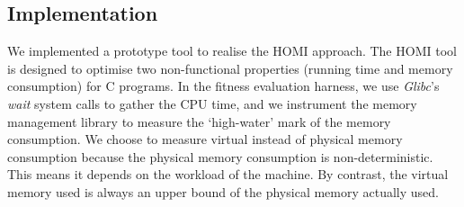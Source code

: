 \documentclass[oribibl]{llncs}
\begin{document}
\subsection{Implementation}
\vspace{-4mm}
We implemented a prototype tool to realise the HOMI approach. The HOMI tool is designed to optimise two non-functional properties (running time and memory consumption) for C programs.
In the fitness evaluation harness, we use \emph{Glibc}'s \emph{wait} system calls to gather the CPU time, and we instrument the memory management library to measure the `high-water' mark of the memory consumption. We choose to measure virtual instead of physical memory consumption because the physical memory consumption is non-deterministic. This means it depends on the workload of the machine. By contrast, the virtual memory used is always an upper bound of the physical memory actually used.
\end{document}
